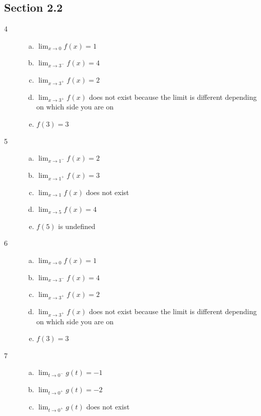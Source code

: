 \documentclass[letterpaper]{exam}
\begin{document}
    \subsection{Section 2.2}
    \begin{description}

      \item[4]
        \begin{enumerate}[(a)]
          \item $\lim_{x \to 0} f(x) = 1$
          \item $\lim_{x \to 3^-} f(x) = 4$
          \item $\lim_{x \to 3^+} f(x) = 2$
          \item $\lim_{x \to 3^+} f(x)$ does not exist because the limit is
            different depending on which side you are on
          \item $f(3) = 3$
        \end{enumerate}

      \item[5]
        \begin{enumerate}[(a)]
          \item $\lim_{x \to 1^-} f(x) = 2$
          \item $\lim_{x \to 1^+} f(x) = 3$
          \item $\lim_{x \to 1} f(x)$ does not exist
          \item $\lim_{x \to 5} f(x) = 4$
          \item $f(5)$ is undefined
        \end{enumerate}

      \item[6]
        \begin{enumerate}[(a)]
          \item $\lim_{x \to 0} f(x) = 1$
          \item $\lim_{x \to 3^-} f(x) = 4$
          \item $\lim_{x \to 3^+} f(x) = 2$
          \item $\lim_{x \to 3^+} f(x)$ does not exist because the limit is
            different depending on which side you are on
          \item $f(3) = 3$
        \end{enumerate}

      \item[7]
        \begin{enumerate}[(a)]
          \item $\lim_{t \to 0^-} g(t) = -1$
          \item $\lim_{t \to 0^+} g(t) = -2$
          \item $\lim_{t \to 0^+} g(t)$ does not exist


\end{enumerate}
\end{description}
\end{document}
